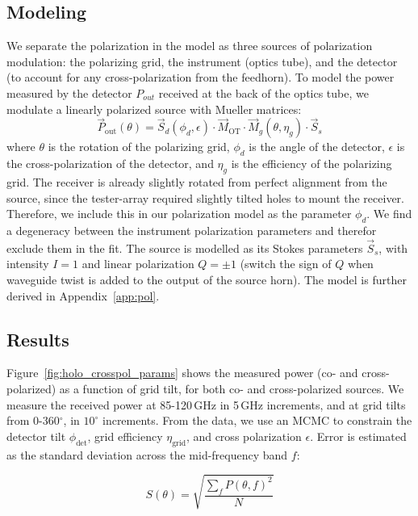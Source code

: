 \subsection{Modeling}
We separate the polarization in the model as three sources of polarization modulation: the polarizing grid, the instrument (optics tube), and the detector (to account for any cross-polarization from the feedhorn).  To model the power measured by the detector $P_{out}$ received at the back of the optics tube, we modulate a linearly polarized source with Mueller matrices:
\begin{equation}
    \vec{P}_{\text{out}}(\theta) = \vec{S}_{d}(\phi_{d},\epsilon)\cdot \vec{M}_{\text{OT}}\cdot \vec{M}_{g}(\theta,\eta_{g})\cdot \vec{S}_{s}
\end{equation}
where $\theta$ is the rotation of the polarizing grid, $\phi_d$ is the angle of the detector, $\epsilon$ is the cross-polarization of the detector, and $\eta_g$ is the efficiency of the polarizing grid.  The receiver is already slightly rotated from perfect alignment from the source, since the tester-array required slightly tilted holes to mount the receiver.  Therefore, we include this in our polarization model as the parameter $\phi_d$.  We find a degeneracy between the instrument polarization parameters and therefor exclude them in the fit.  The source is modelled as its Stokes parameters $\vec{S}_{s}$, with intensity $I=1$ and linear polarization $Q=\pm 1$ (switch the sign of $Q$ when waveguide twist is added to the output of the source horn).  The model is further derived in Appendix~\ref{app:pol}.  

\subsection{Results}
Figure~\ref{fig:holo_crosspol_params} shows the measured power (co- and cross-polarized) as a function of grid tilt, for both co- and cross-polarized sources.  We measure the received power at 85-120\,GHz in 5\,GHz increments, and at grid tilts from 0-360$^{\circ}$, in $10^{\circ}$ increments.  From the data, we use an MCMC to constrain the detector tilt $\phi_{\text{det}}$, grid efficiency $\eta_{\text{grid}}$, and cross polarization $\epsilon$.  Error is estimated as the standard deviation across the mid-frequency band $f$:

\begin{equation}
    S(\theta) = \sqrt{\frac{\sum_f P(\theta,f)^2}{N}}
\end{equation}


